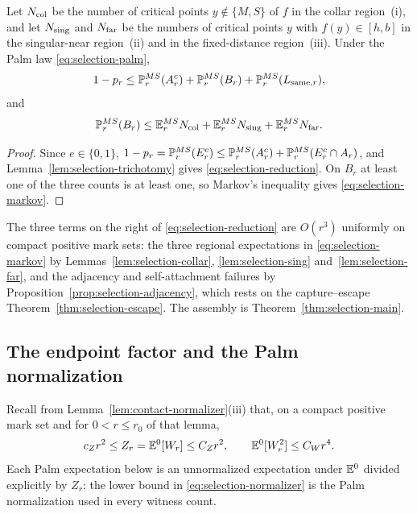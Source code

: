 \begin{corollary}\label{cor:selection-reduction}
Let $N_{\rm col}$ be the number of critical points $y\notin\{M,S\}$ of $f$ in the collar region~(i), and let $N_{\rm sing}$ and $N_{\rm far}$ be the numbers of critical points $y$ with $f(y)\in[h,b]$ in the singular-near region~(ii) and in the fixed-distance region~(iii). Under the Palm law \eqref{eq:selection-palm},
\begin{equation}\label{eq:selection-reduction}
1-p_r\le\mathbb P^{MS}_r(A_r^c)+\mathbb P^{MS}_r(B_r)+\mathbb P^{MS}_r(L_{{\rm same},r}),
\end{equation}
and
\begin{equation}\label{eq:selection-markov}
\mathbb P^{MS}_r(B_r)\le\mathbb E^{MS}_rN_{\rm col}+\mathbb E^{MS}_rN_{\rm sing}+\mathbb E^{MS}_rN_{\rm far}.
\end{equation}
\end{corollary}

\begin{proof}
Since $e\in\{0,1\}$, $1-p_r=\mathbb P^{MS}_r(E_r^c)\le\mathbb P^{MS}_r(A_r^c)+\mathbb P^{MS}_r(E_r^c\cap A_r)$, and Lemma~\ref{lem:selection-trichotomy} gives \eqref{eq:selection-reduction}. On $B_r$ at least one of the three counts is at least one, so Markov's inequality gives \eqref{eq:selection-markov}.
\end{proof}

The three terms on the right of \eqref{eq:selection-reduction} are $O(r^3)$ uniformly on compact positive mark sets: the three regional expectations in \eqref{eq:selection-markov} by Lemmas~\ref{lem:selection-collar}, \ref{lem:selection-sing} and~\ref{lem:selection-far}, and the adjacency and self-attachment failures by Proposition~\ref{prop:selection-adjacency}, which rests on the capture--escape Theorem~\ref{thm:selection-escape}. The assembly is Theorem~\ref{thm:selection-main}.

\subsection{The endpoint factor and the Palm normalization}\label{ssec:selection-endpoint}

Recall from Lemma~\ref{lem:contact-normalizer}(iii) that, on a compact positive mark set and for $0<r\le r_0$ of that lemma,
\begin{equation}\label{eq:selection-normalizer}
c_Zr^2\le Z_r=\mathbb E^0[W_r]\le C_Zr^2,\qquad\mathbb E^0[W_r^2]\le C_Wr^4 .
\end{equation}
Each Palm expectation below is an unnormalized expectation under $\mathbb E^0$ divided explicitly by $Z_r$; the lower bound in \eqref{eq:selection-normalizer} is the Palm normalization used in every witness count.

